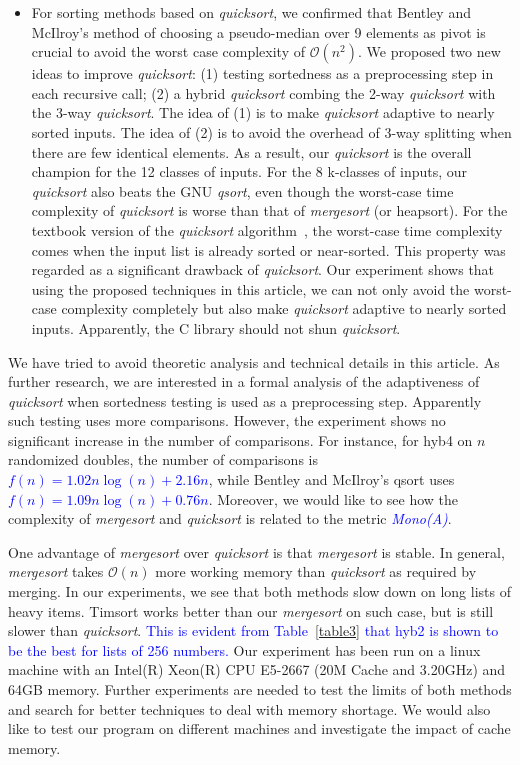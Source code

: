 \documentclass[AMA,STIX1COL]{WileyNJD-v2}
\newcommand {\mono}{\emph{\textcolor{blue}{Mono(A)}}}
\newcommand{\qusort}{\emph{quicksort }}
\newcommand{\qusortn}{\emph{quicksort}}
\newcommand{\qsortn}{\emph{qsort}}
\newcommand{\msort}{\emph{mergesort }}
\begin{document}
\begin{itemize}
\item For sorting methods based on \qusortn, we confirmed that Bentley and McIlroy’s method of choosing a pseudo-median over 9 elements as pivot is crucial to avoid the worst case complexity of $\mathcal{O}(n^2)$. 
We proposed two new ideas to improve \qusortn: (1) testing sortedness as a preprocessing step in each recursive call; (2) a hybrid \qusort combing the 2-way \qusort with the 3-way \qusortn. The idea of (1) is to make \qusort adaptive to nearly sorted inputs. The idea of (2) is to avoid the overhead of 3-way splitting when there are few identical elements. As a result, our \qusort is the overall champion for the 12 classes of inputs. For the 8 k-classes of inputs, our \qusort also beats the GNU \qsortn, even though the worst-case time complexity of \qusort is worse than that of \msort (or heapsort). For the textbook version of the \qusort algorithm~\cite{10.5555/1614191}, the worst-case time complexity comes when the input list is already sorted or near-sorted. This property was regarded as a significant drawback of \qusortn. Our experiment shows that using the proposed techniques in this article, we can not only avoid the worst-case complexity completely but also make \qusort adaptive to nearly sorted inputs. Apparently, the C library should not shun \qusortn.
\end{itemize}

We have tried to avoid theoretic analysis and technical details in this article. 
As further research, we are interested in a formal analysis of the adaptiveness of \qusort when sortedness testing is used as a preprocessing step. 
Apparently such testing uses more comparisons.  
However, the experiment shows no significant increase in the number of comparisons. 
For instance, for hyb4 on $n$ randomized doubles, the number of comparisons is \textcolor{blue}{$f(n) = 1.02n\log(n) + 2.16n$}, while Bentley and McIlroy’s qsort uses \textcolor{blue}{$f(n) = 1.09n\log(n) + 0.76n$}.  
Moreover, we would like to see how the complexity of \msort and \qusort is related to the metric \mono.

One advantage of \msort over \qusort is that \msort is stable. In general, \msort takes $\mathcal{O}(n)$ more working memory than \qusort as required by merging. 
In our experiments, we see that both methods slow down on long lists of heavy items. Timsort works better than our \msort on such case, but is still slower than \qusortn. 
\textcolor{blue}{This is evident from Table~\ref{table3} that hyb2 is shown to be the best for lists of 256 numbers.}
Our experiment has been run on a linux machine with an Intel(R) Xeon(R) CPU E5-2667 (20M Cache and 3.20GHz) and 64GB memory. 
Further experiments are needed to test the limits of both methods and search for better techniques to deal with memory shortage. 
We would also like to test our program on different machines and investigate the impact of cache memory. 
\end{document}
